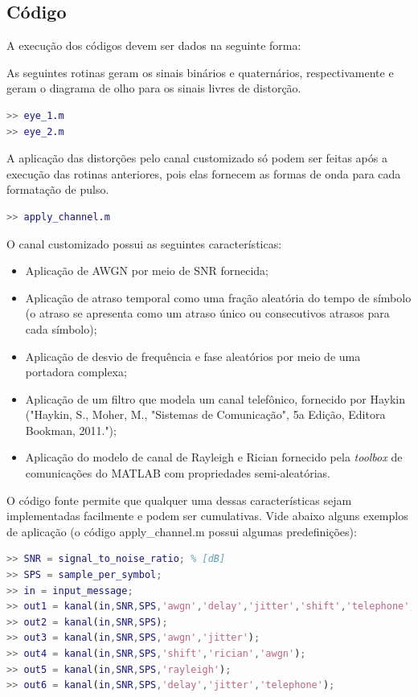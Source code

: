 
\subsection*{Código}
A execução dos códigos devem ser dados na seguinte forma:

As seguintes rotinas geram os sinais binários e quaternários, respectivamente e geram o diagrama de olho para os sinais livres de distorção. 
\begin{lstlisting}[language=Matlab,style=consolestyle]
>> eye_1.m 
>> eye_2.m
\end{lstlisting}

A aplicação das distorções pelo canal customizado só podem ser feitas após a execução das rotinas anteriores, pois elas fornecem as formas de onda para cada formatação de pulso.

\begin{lstlisting}[language=Matlab,style=consolestyle]
>> apply_channel.m
\end{lstlisting}

O canal customizado possui as seguintes características:

\begin{itemize}
    \item Aplicação de AWGN por meio de SNR fornecida;
    \item Aplicação de atraso temporal como uma fração aleatória do tempo de símbolo (o atraso se apresenta como um atraso único ou consecutivos atrasos para cada símbolo);
    \item Aplicação de desvio de frequência e fase aleatórios por meio de uma portadora complexa;
    \item Aplicação de um filtro que modela um canal telefônico, fornecido por Haykin ("Haykin, S., Moher, M., "Sistemas de Comunicação", 5a Edição, Editora Bookman, 2011.");
    \item Aplicação do modelo de canal de Rayleigh e Rician fornecido pela \textit{toolbox} de comunicações do MATLAB com propriedades semi-aleatórias.
\end{itemize}

O código fonte permite que qualquer uma dessas características sejam implementadas facilmente e podem ser cumulativas. Vide abaixo alguns exemplos de aplicação (o código apply\_channel.m possui algumas predefinições):

\begin{lstlisting}[language=Matlab,style=consolestyle]
>> SNR = signal_to_noise_ratio; % [dB]
>> SPS = sample_per_symbol;
>> in = input_message;
>> out1 = kanal(in,SNR,SPS,'awgn','delay','jitter','shift','telephone','rayleigh','rician');
>> out2 = kanal(in,SNR,SPS);
>> out3 = kanal(in,SNR,SPS,'awgn','jitter');
>> out4 = kanal(in,SNR,SPS,'shift','rician','awgn');
>> out5 = kanal(in,SNR,SPS,'rayleigh');
>> out6 = kanal(in,SNR,SPS,'delay','jitter','telephone');
\end{lstlisting}

